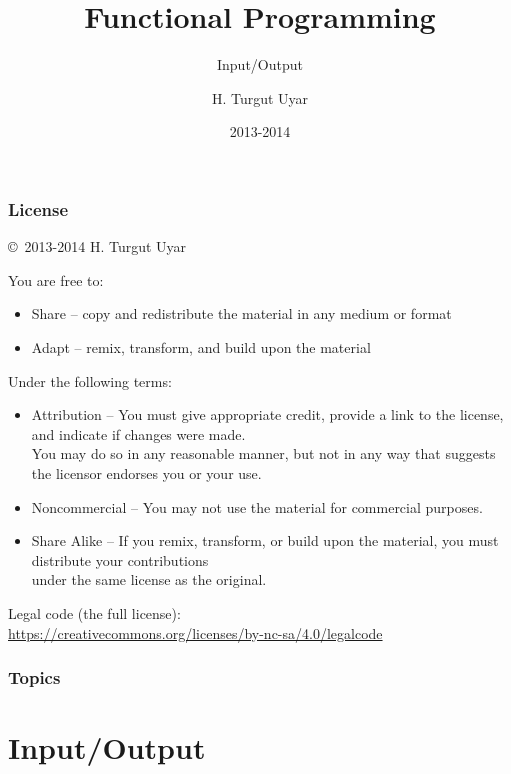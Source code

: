 \documentclass[dvipsnames]{beamer}
\title{Functional Programming}
\subtitle{Input/Output}
\author{H. Turgut Uyar}
\date{2013-2014}
\theoremstyle{plain}
\begin{document}

\begin{frame}
  \titlepage
\end{frame}

\begin{frame}
  \frametitle{License}

  \hfill
  \copyright~2013-2014 H. Turgut Uyar

  \vfill
  \begin{tiny}
    You are free to:
    \begin{itemize}
      \item Share -- copy and redistribute the material in any medium or format
      \item Adapt -- remix, transform, and build upon the material
    \end{itemize}

    Under the following terms:
    \begin{itemize}
      \item Attribution -- You must give appropriate credit, provide a link to
        the license, and indicate if changes were made.\\
        You may do so in any reasonable manner, but not in any way
        that suggests the licensor endorses you or your use.

      \item Noncommercial -- You may not use the material for commercial
        purposes.

      \item Share Alike -- If you remix, transform, or build upon the material,
        you must distribute your contributions\\
        under the same license as the original.
    \end{itemize}
  \end{tiny}

  \vfill
  \begin{small}
    Legal code (the full license):\\
    \url{https://creativecommons.org/licenses/by-nc-sa/4.0/legalcode}
  \end{small}
\end{frame}

\begin{frame}
  \frametitle{Topics}
  \tableofcontents
\end{frame}

\section{Input/Output}
\end{document}
